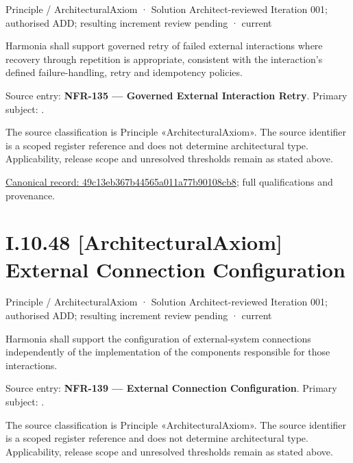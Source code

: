 \label{element:49c13eb367b44565a011a77b90108cb8}
{\small Principle / ArchitecturalAxiom · Solution Architect-reviewed Iteration 001; authorised ADD; resulting increment review pending · current}\par

Harmonia shall support governed retry of failed external interactions where recovery through repetition is appropriate, consistent with the interaction's defined failure-handling, retry and idempotency policies.



Source entry: \textbf{NFR-135 — Governed External Interaction Retry}. Primary subject: \texttt{}.



The source classification is Principle «ArchitecturalAxiom». The source identifier is a scoped register reference and does not determine architectural type. Applicability, release scope and unresolved thresholds remain as stated above.


{\footnotesize \href{../../../../continuum/motivation/principle/architectural-axiom/49c13eb367b44565a011a77b90108cb8.md}{Canonical record: 49c13eb367b44565a011a77b90108cb8}; full qualifications and provenance.}\par
\section*{I.10.48 [ArchitecturalAxiom] External Connection Configuration}
\label{navigation:I.10.48}

\label{element:f24e63c49135411bbfbc06f9385aeea5}
{\small Principle / ArchitecturalAxiom · Solution Architect-reviewed Iteration 001; authorised ADD; resulting increment review pending · current}\par

Harmonia shall support the configuration of external-system connections independently of the implementation of the components responsible for those interactions.



Source entry: \textbf{NFR-139 — External Connection Configuration}. Primary subject: \texttt{}.



The source classification is Principle «ArchitecturalAxiom». The source identifier is a scoped register reference and does not determine architectural type. Applicability, release scope and unresolved thresholds remain as stated above.


